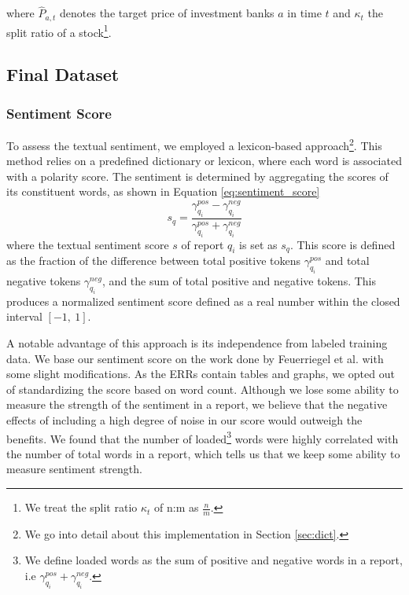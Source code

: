 where \(\hat{P}_{a,t}\) denotes the target price of investment banks \(a\) in time \(t\) and \(\kappa_t\) the split ratio of a stock\footnote{We treat the split ratio \(\kappa_t\) of n:m as $\frac{n}{m}$.}. 



\subsection{Final Dataset}

\subsubsection{Sentiment Score}

To assess the textual sentiment, we employed a lexicon-based approach\footnote{We go into detail about this implementation in Section \ref{sec:dict}.}. This method relies on a predefined dictionary or lexicon, where each word is associated with a polarity score. The sentiment is determined by aggregating the scores of its constituent words, as shown in Equation \ref{eq:sentiment_score} 
\begin{equation}
\label{eq:sentiment_score}
    s_q = \frac{\gamma^{pos}_{q_i} - \gamma^{neg}_{q_i}}{\gamma^{pos}_{q_i} + \gamma^{neg}_{q_i}}
\end{equation}
where the textual sentiment score \(s\) of report \(q_i\) is set as \(s_q\). This score is defined as the fraction of the difference between total positive tokens \(\gamma^{pos}_{q_i}\) and total negative tokens \(\gamma^{neg}_{q_i}\), and the sum of total positive and negative tokens. This produces a normalized sentiment score defined as a real number within the closed interval \([-1,\:1]\).

A notable advantage of this approach is its independence from labeled training data. We base our sentiment score on the work done by Feuerriegel et al. \parencite*{feuerriegel2015information} with some slight modifications. As the ERRs contain tables and graphs, we opted out of standardizing the score based on word count. Although we lose some ability to measure the strength of the sentiment in a report, we believe that the negative effects of including a high degree of noise in our score would outweigh the benefits. We found that the number of loaded\footnote{We define loaded words as the sum of positive and negative words in a report, i.e \(\gamma^{pos}_{q_i} + \gamma^{neg}_{q_i}\).} words were highly correlated with the number of total words in a report, which tells us that we keep some ability to measure sentiment strength.


